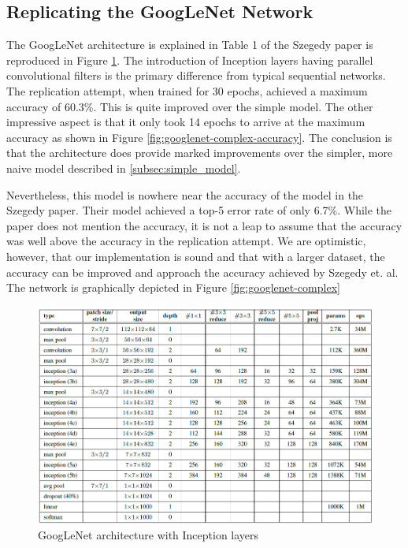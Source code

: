 \documentclass{article}
\begin{document}
\subsection{Replicating the GoogLeNet Network}
The GoogLeNet architecture is explained in Table 1 of the Szegedy paper is reproduced in Figure \ref{fig:googlenet-arch}. The introduction of Inception layers having parallel convolutional filters is the primary difference from typical sequential networks. The replication attempt, when trained for 30 epochs, achieved a maximum accuracy of 60.3\%. This is quite improved over the simple model. The other impressive aspect is that it only took 14 epochs to arrive at the maximum accuracy as shown in Figure \ref{fig:googlenet-complex-accuracy}. The conclusion is that the architecture does provide marked improvements over the simpler, more naive model described in \ref{subsec:simple_model}.

Nevertheless, this model is nowhere near the accuracy of the model in the Szegedy paper. Their model achieved a top-5 error rate of only 6.7\%. While the paper does not mention the accuracy, it is not a leap to assume that the accuracy was well above the accuracy in the replication attempt. We are optimistic, however, that our implementation is sound and that with a larger dataset, the accuracy can be improved and approach the accuracy achieved by Szegedy et. al. The network is graphically depicted in Figure \ref{fig:googlenet-complex}

\begin{figure}[ht]
    \centering
    \includegraphics[scale=0.7]{project/paper_images/googlenet_arch.png}
    \caption{GoogLeNet architecture with Inception layers}
    \label{fig:googlenet-arch}
\end{figure}
\end{document}
